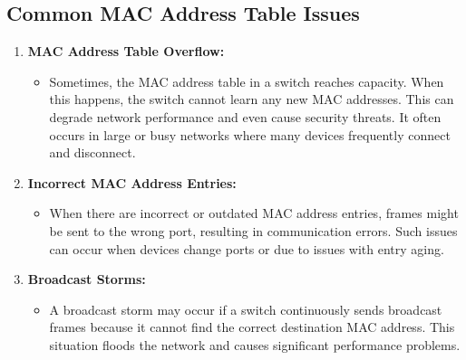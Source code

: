 \documentclass[11pt,a4paper]{article}
\begin{document}
\subsection*{Common MAC Address Table Issues}
\begin{enumerate}
    \item \textbf{MAC Address Table Overflow:}
        \begin{itemize}
            \item Sometimes, the MAC address table in a switch reaches capacity. When this happens, the switch cannot learn any new MAC addresses. This can degrade network performance and even cause security threats. It often occurs in large or busy networks where many devices frequently connect and disconnect.
        \end{itemize}

    \item \textbf{Incorrect MAC Address Entries:}
        \begin{itemize}
            \item When there are incorrect or outdated MAC address entries, frames might be sent to the wrong port, resulting in communication errors. Such issues can occur when devices change ports or due to issues with entry aging.
        \end{itemize}

    \item \textbf{Broadcast Storms:}
        \begin{itemize}
            \item A broadcast storm may occur if a switch continuously sends broadcast frames because it cannot find the correct destination MAC address. This situation floods the network and causes significant performance problems.
        \end{itemize}

\end{enumerate}
\end{document}
